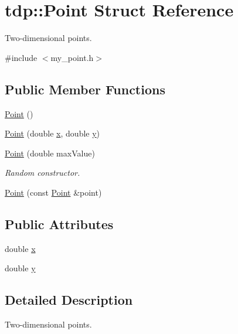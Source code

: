 \hypertarget{structtdp_1_1_point}{}\section{tdp\+:\+:Point Struct Reference}
\label{structtdp_1_1_point}


Two-\/dimensional points.  




{\ttfamily \#include $<$my\+\_\+point.\+h$>$}

\subsection*{Public Member Functions}
\begin{DoxyCompactItemize}
\item 
\mbox{\hyperlink{structtdp_1_1_point_a3cf3dffca0486d5b72eb8fff8f5b2f52}{Point}} ()
\item 
\mbox{\hyperlink{structtdp_1_1_point_ab713435b69e5d6cfe3704739cf2eef1e}{Point}} (double \mbox{\hyperlink{structtdp_1_1_point_a31898184708346947177896af4c7eac6}{x}}, double \mbox{\hyperlink{structtdp_1_1_point_af46e9a346f374660a675336c2e619a69}{y}})
\item 
\mbox{\hyperlink{structtdp_1_1_point_a37a23b239ed2dcc7b803fb851b1c4c11}{Point}} (double max\+Value)
\begin{DoxyCompactList}\small\item\em Random constructor. \end{DoxyCompactList}\item 
\mbox{\hyperlink{structtdp_1_1_point_af13c65c1b6d9a0cd1d5360eb29c8e1ce}{Point}} (const \mbox{\hyperlink{structtdp_1_1_point}{Point}} \&point)
\end{DoxyCompactItemize}
\subsection*{Public Attributes}
\begin{DoxyCompactItemize}
\item 
double \mbox{\hyperlink{structtdp_1_1_point_a31898184708346947177896af4c7eac6}{x}}
\item 
double \mbox{\hyperlink{structtdp_1_1_point_af46e9a346f374660a675336c2e619a69}{y}}
\end{DoxyCompactItemize}


\subsection{Detailed Description}
Two-\/dimensional points. 

